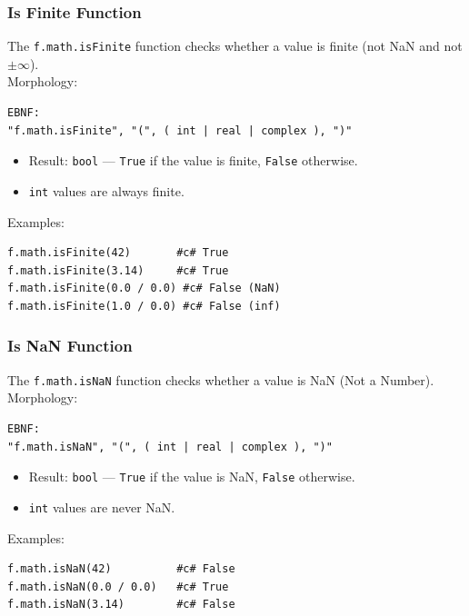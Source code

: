 \subsubsection{Is Finite Function}
The \texttt{f.math.isFinite} function checks whether a value is finite (not NaN and not $\pm\infty$). \\
Morphology:
\begin{verbatim}
EBNF:
"f.math.isFinite", "(", ( int | real | complex ), ")"
\end{verbatim}
\begin{itemize}
\item Result: \texttt{bool} --- \texttt{True} if the value is finite, \texttt{False} otherwise.
\item \texttt{int} values are always finite.
\end{itemize}
Examples:
\begin{verbatim}
f.math.isFinite(42)       #c# True
f.math.isFinite(3.14)     #c# True
f.math.isFinite(0.0 / 0.0) #c# False (NaN)
f.math.isFinite(1.0 / 0.0) #c# False (inf)
\end{verbatim}

\subsubsection{Is NaN Function}
The \texttt{f.math.isNaN} function checks whether a value is NaN (Not a Number). \\
Morphology:
\begin{verbatim}
EBNF:
"f.math.isNaN", "(", ( int | real | complex ), ")"
\end{verbatim}
\begin{itemize}
\item Result: \texttt{bool} --- \texttt{True} if the value is NaN, \texttt{False} otherwise.
\item \texttt{int} values are never NaN.
\end{itemize}
Examples:
\begin{verbatim}
f.math.isNaN(42)          #c# False
f.math.isNaN(0.0 / 0.0)   #c# True
f.math.isNaN(3.14)        #c# False
\end{verbatim}

